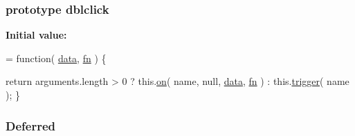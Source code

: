 \subsubsection[{dblclick}]{ {\bf prototype} dblclick}\label{jquery-1_810_82-vsdoc_8js_a94c0d6e51790b913f3bcdb696d3d2863}
{\bfseries Initial value\+:}
\begin{DoxyCode}
= \textcolor{keyword}{function}( \hyperlink{jquery-1_810_82-vsdoc_8js_a609407b3456fdc3c5671a9fc4a226ff7}{data}, \hyperlink{jquery-1_810_82-vsdoc_8js_acef6bdaf6b9b20fdcca1ea86f0902c3b}{fn} ) \{


        \textcolor{keywordflow}{return} arguments.length > 0 ?
            this.\hyperlink{jquery-1_810_82-vsdoc_8js_ae453b412b883f60220d73468ef6c6dbc}{on}( name, null, \hyperlink{jquery-1_810_82-vsdoc_8js_a609407b3456fdc3c5671a9fc4a226ff7}{data}, \hyperlink{jquery-1_810_82-vsdoc_8js_acef6bdaf6b9b20fdcca1ea86f0902c3b}{fn} ) :
            this.\hyperlink{jquery-1_810_82-vsdoc_8js_a2388c4114d5e3e4eab020f973641519c}{trigger}( name );
    \}
\end{DoxyCode}
\hypertarget{jquery-1_810_82-vsdoc_8js_ab355ffd82371d88c17da7c1dae9e8829}{}
\subsubsection[{Deferred}]{ Deferred}\label{jquery-1_810_82-vsdoc_8js_ab355ffd82371d88c17da7c1dae9e8829}
\hypertarget{jquery-1_810_82-vsdoc_8js_a90055e3b93c579a9e3f764ee3c04639a}{}
